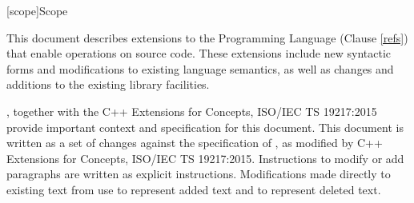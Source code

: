 
[scope]{Scope}

\pnum
This document describes extensions to the \Cpp Programming
Language (Clause \ref{refs}) that enable operations on source code. These
extensions include new syntactic forms and modifications to existing language
semantics, as well as changes and additions to the existing library facilities.

\pnum
{\cppstddocno}, together with the C++ Extensions for
Concepts, ISO/IEC TS 19217:2015 provide important context and specification for
this document. This document is written as a set of changes against the
specification of {\cppstddocno}, as modified by C++ Extensions for Concepts,
ISO/IEC TS 19217:2015.  Instructions to modify or add paragraphs are written as
explicit instructions.  Modifications made directly to existing text from {\cppstddocno} use  to represent added text and  to represent deleted text.
